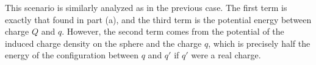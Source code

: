{This scenario is similarly analyzed as in the previous case.
The first term is exactly that found in part (a), and the third term is the potential energy between charge $Q$ and $q$.
However, the second term comes from the potential of the induced charge density on the sphere and the charge $q$, which is precisely half the energy of the configuration between $q$ and $q'$ if $q'$ were a real charge.

}




